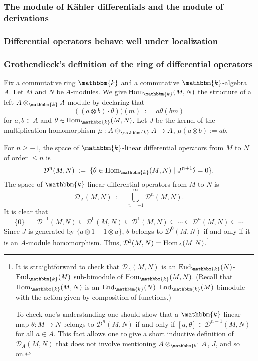 \documentclass[12pt]{article}
\newcommand{\Bbbk}{\mathbbm{k}}
\newcommand{\cD}{\mathcal D}
\begin{document}
\subsubsection{The module of K\"ahler differentials and the module of derivations}
\label{ssect.Kahler.diffls} 


\subsubsection{Differential operators behave well under localization}





\subsubsection{Grothendieck's definition of the ring of differential operators}
Fix a commutative ring $\Bbbk$ and a commutative $\Bbbk$-algebra $A$. Let $M$ and $N$ be $A$-modules. We give
$\Hom_\Bbbk(M,N)$ the structure of a left $A \otimes_\Bbbk A$-module by declaring that 
$$
((a \otimes b) \cdot \theta))(m) \; :=\; a\theta(bm)
$$
for $a,b \in A$ and $\theta \in \Hom_\Bbbk(M,N)$.
Let $J$ be the kernel of the multiplication homomorphism $\mu:A \otimes_\Bbbk A \to A$, $\mu(a \otimes b):=ab$. 


For $n \ge -1$, the space of {\sf $\Bbbk$-linear differential operators from $M$ to $N$ of order $\le n$} is 
$$
\cD^n(M,N) \; :=\; \{ \theta \in \Hom_\Bbbk(M,N) \; | \; J^{n+1}\theta =0\}.
$$
The space of {\sf $\Bbbk$-linear differential operators from $M$ to $N$} is
$$
 \cD_A(M,N) \; :=\; \bigcup_{n=-1}^\infty \cD^n(M,N).
 $$
It is clear that
$$
\{0\} \, = \, \cD^{-1}(M,N) \subseteq \cD^0(M,N) \subseteq  \cD^1(M,N) \subseteq \cdots \subseteq \cD^n(M,N) \subseteq \cdots 
$$
Since $J$ is generated by $\{a \otimes 1-1 \otimes a\}$, $\theta$ belongs to $\cD^0(M,N)$ if and only if it is an $A$-module
homomorphism. Thus, $\cD^0(M,N)=\Hom_A(M,N)$.\footnote{It is straightforward to check that $ \cD_A(M,N)$ is an $\End_\Bbbk(N)$-$\End_\Bbbk(M)$ sub-bimodule of $\Hom_\Bbbk(M,N)$.
(Recall that $\Hom_\Bbbk(M,N)$ is an $\End_\Bbbk(N)$-$\End_\Bbbk(M)$ bimodule with the action given by composition of functions.)


To check one's understanding one should show that a $\Bbbk$-linear map $\theta:M \to N$ belongs to $\cD^n(M,N)$ if and only if 
$[a,\theta] \in \cD^{n-1}(M,N) $ for all $a \in A$. This fact allows one to give a short inductive definition of $\cD_A(M,N)$ that does not involve
mentioning $A \otimes_\Bbbk A$, $J$, and so on.}
\end{document}
